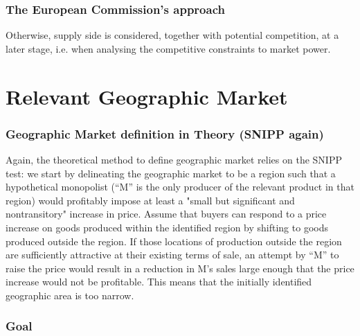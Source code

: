         \subsubsection{The European Commission's approach}


            Otherwise, supply side is considered, together with potential competition, at a later stage, i.e. when analysing the competitive constraints to market power.

            
\newpage
\section{Relevant Geographic Market}

        \subsubsection{Geographic Market definition in Theory (SNIPP again)}

            Again, the theoretical method to define geographic market relies on the SNIPP test: we start by delineating the geographic market to be a region such that a hypothetical monopolist (“M” is the only producer of the relevant product in that region) would profitably impose at least a "small but significant and nontransitory" increase in price.
            Assume that buyers can respond to a price increase on goods produced within the identified region by shifting to goods produced outside the region. If those locations of production outside the region are sufficiently attractive at their existing terms of sale, an attempt by “M” to raise the price would result in a reduction in M’s sales large enough that the price increase would not be profitable. This means that the initially identified geographic area is too narrow.

        \subsubsection{Goal}

